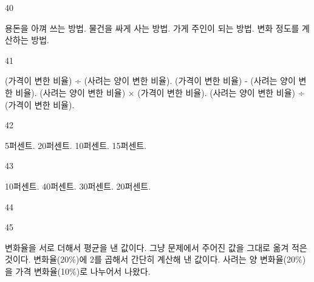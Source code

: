 \documentclass[fs9,seriesFre]{korfarm-base}
\begin{document}
\begin{kfSentenceUnit}{40}{}
\begin{kfChoices}
\kfChoice 용돈을 아껴 쓰는 방법.
\kfChoice 물건을 싸게 사는 방법.
\kfChoice 가게 주인이 되는 방법.
\kfChoice 변화 정도를 계산하는 방법.
\end{kfChoices}
\end{kfSentenceUnit}

\begin{kfSentenceUnit}{41}{}
\begin{kfChoices}
\kfChoice (가격이 변한 비율) ÷ (사려는 양이 변한 비율).
\kfChoice (가격이 변한 비율) - (사려는 양이 변한 비율).
\kfChoice (사려는 양이 변한 비율) × (가격이 변한 비율).
\kfChoice (사려는 양이 변한 비율) ÷ (가격이 변한 비율).
\end{kfChoices}
\end{kfSentenceUnit}

\begin{kfSentenceUnit}{42}{}
\begin{kfChoices}
\kfChoice 5퍼센트.
\kfChoice 20퍼센트.
\kfChoice 10퍼센트.
\kfChoice 15퍼센트.
\end{kfChoices}
\end{kfSentenceUnit}

\begin{kfSentenceUnit}{43}{}
\begin{kfChoices}
\kfChoice 10퍼센트.
\kfChoice 40퍼센트.
\kfChoice 30퍼센트.
\kfChoice 20퍼센트.
\end{kfChoices}
\end{kfSentenceUnit}

\begin{kfSentenceUnit}{44}{}
\begin{kfChoices}
\end{kfChoices}
\end{kfSentenceUnit}

\begin{kfSentenceUnit}{45}{}
\begin{kfChoices}
\kfChoice 변화율을 서로 더해서 평균을 낸 값이다.
\kfChoice 그냥 문제에서 주어진 값을 그대로 옮겨 적은 것이다.
\kfChoice 변화율(20\%)에 2를 곱해서 간단히 계산해 낸 값이다.
\kfChoice 사려는 양 변화율(20\%)을 가격 변화율(10\%)로 나누어서 나왔다.
\end{kfChoices}
\end{kfSentenceUnit}
\end{document}

